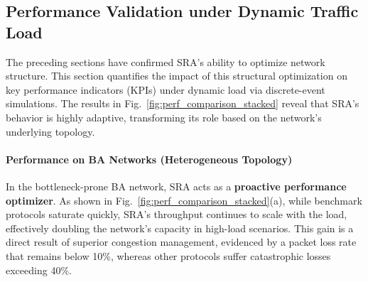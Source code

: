\documentclass[journal]{IEEEtran}
\begin{document}
\begin{table}[h!]
\centering
\caption{Analysis of Structural Optimization Benefits of SRA (Mean $\pm$ Std Dev over 100 runs)}
\label{tab:structural_benefits_stats}
\end{table}

\subsection{Performance Validation under Dynamic Traffic Load}
\label{subsec:dynamic_performance}

The preceding sections have confirmed SRA's ability to optimize network structure. This section quantifies the impact of this structural optimization on key performance indicators (KPIs) under dynamic load via discrete-event simulations. The results in Fig.~\ref{fig:perf_comparison_stacked} reveal that SRA's behavior is highly adaptive, transforming its role based on the network's underlying topology.

\paragraph{Performance on BA Networks (Heterogeneous Topology)}
In the bottleneck-prone BA network, SRA acts as a \textbf{proactive performance optimizer}. As shown in Fig.~\ref{fig:perf_comparison_stacked}(a), while benchmark protocols saturate quickly, SRA's throughput continues to scale with the load, effectively doubling the network's capacity in high-load scenarios. This gain is a direct result of superior congestion management, evidenced by a packet loss rate that remains below 10\%, whereas other protocols suffer catastrophic losses exceeding 40\%.
\end{document}
